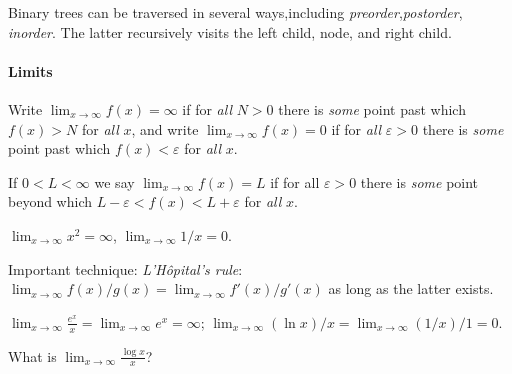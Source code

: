Binary trees can be traversed in several ways,including \emph{preorder},\emph{postorder}, \emph{inorder}. The latter recursively visits the left child, node, and right child.

\paragraph{Limits}

Write $\lim_{x\to \infty} f(x) = \infty$ if for \emph{all} $N>0$ there is \emph{some} point past which $f(x) > N$ for \emph{all} $x$, and write $\lim_{x\to\infty} f(x) = 0$ if for \emph{all} $\varepsilon>0$ there is \emph{some} point past which $f(x) < \varepsilon$ for \emph{all} $x$.

If $0 < L < \infty$ we say $\lim_{x\to\infty} f(x) = L$ if for all $\varepsilon > 0$ there is \emph{some} point beyond which $L - \varepsilon < f(x) < L + \varepsilon$ for \emph{all} $x$.

\begin{Example}
$\lim_{x\to\infty} x^2 = \infty$, $\lim_{x\to \infty} 1/x = 0$.
\end{Example}

Important technique: \emph{L'H\^{o}pital's rule}: $\lim_{x\to \infty} f(x)/g(x) = \lim_{x\to \infty} f'(x)/g'(x)$ as long as the latter exists. 

\begin{Example}
 $\lim_{x\to\infty} \frac{e^x}{x} = \lim_{x\to\infty} e^x = \infty$; $\lim_{x\to\infty} (\ln x)/x = \lim_{x\to\infty} (1/x)/1 = 0$.
 \end{Example}
 
 \begin{Boxample}[5]
What is  $\lim_{x\to\infty} \frac{\log x}{x}$?
 
 \end{Boxample}



